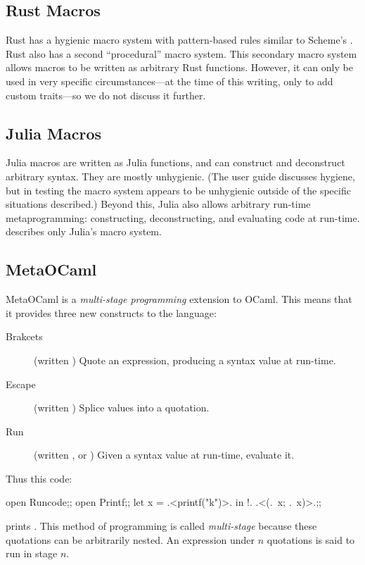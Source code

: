 \subsection{Rust Macros}

Rust has a hygienic macro system with pattern-based rules similar to
Scheme's . Rust also has a second
``procedural'' macro system. This secondary macro system allows
macros to be written as arbitrary Rust functions. However, it can only
be used in very specific circumstances---at the time of this writing,
only to add custom  traits---so we do not discuss it
further.

\subsection{Julia Macros}

Julia macros are written as Julia functions, and can construct and
deconstruct arbitrary syntax. They are mostly unhygienic. (The user
guide discusses hygiene, but in testing the macro system appears to be unhygienic
outside of the specific situations described.) Beyond this, Julia also
allows arbitrary run-time metaprogramming: constructing,
deconstructing, and evaluating code at run-time.
 describes only Julia's macro system.

\subsection{MetaOCaml} \label{sec:taxonomy-metaocaml}

MetaOCaml is a \emph{multi-stage programming} extension to OCaml. This
means that it provides three new constructs to the language:
\begin{description}
\item[Brakcets] (written ) Quote an expression,
  producing a syntax value at run-time.
\item[Escape] (written ) Splice values into a quotation.
\item[Run] (written , or ) Given a syntax value at
  run-time, evaluate it.
\end{description}
Thus this code:
\begin{Codes}
open Runcode;;
open Printf;;
let x = .<printf("k")>. in !. .<(.~x; .~x)>.;;
\end{Codes}
prints . This method of programming is called
\emph{multi-stage} because these quotations can be arbitrarily
nested. An expression under $n$ quotations is said to run in stage
$n$.

